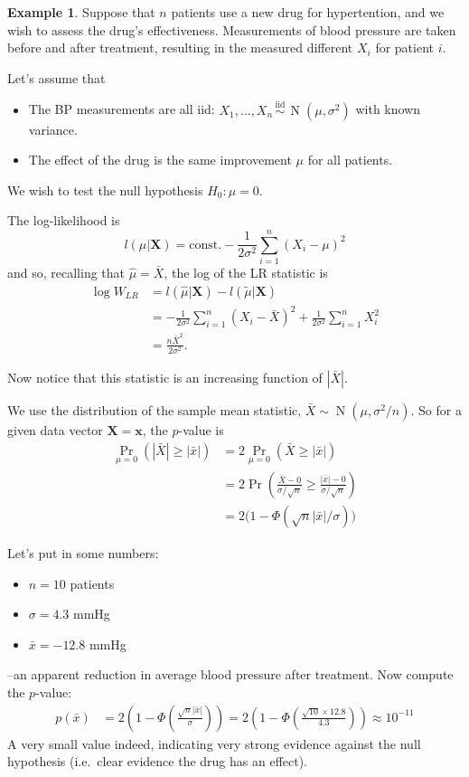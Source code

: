 \documentclass[
]{book}
\providecommand{\tightlist}{%
  \setlength{\itemsep}{0pt}\setlength{\parskip}{0pt}}
\newcommand{\bx}{{\boldsymbol x}}
\newcommand{\bX}{{\boldsymbol X}}
\DeclareMathOperator{\N}{N}
\newcommand{\iid}{\,\overset{\text{iid}}{\sim}\,}
\newcommand{\const}{\text{const.}}
\theoremstyle{definition}
\theoremstyle{definition}
\newtheorem{example}{Example}[chapter]
\theoremstyle{definition}
\theoremstyle{definition}
\theoremstyle{remark}
\begin{document}
\begin{example}
\protect\hypertarget{exm:normalknownvariance}{}\label{exm:normalknownvariance}Suppose that \(n\) patients use a new drug for hypertention, and we wish to assess the drug's effectiveness.
Measurements of blood pressure are taken before and after treatment, resulting in the measured different \(X_i\) for patient \(i\).

Let's assume that

\begin{itemize}
\tightlist
\item
  The BP measurements are all iid: \(X_1,\dots,X_n\iid\N(\mu,\sigma^2)\) with known variance.
\item
  The effect of the drug is the same improvement \(\mu\) for all patients.
\end{itemize}

We wish to test the null hypothesis \(H_0:\mu=0\).

The log-likelihood is
\[
l(\mu|\bX) = \const - \frac{1}{2\sigma^2}\sum_{i=1}^n (X_i-\mu)^2
\]
and so, recalling that \(\hat\mu=\bar X\), the log of the LR statistic is
\begin{align*}
\log W_{LR} 
&= l(\hat\mu|\bX) - l(\tilde \mu|\bX) \\
&= - \frac{1}{2\sigma^2}\sum_{i=1}^n (X_i-\bar X)^2 +  \frac{1}{2\sigma^2}\sum_{i=1}^n X_i^2 \\
&= \frac{n\bar X^2}{2\sigma^2}.
\end{align*}

Now notice that this statistic is an increasing function of \(|\bar X|\).

We use the distribution of the sample mean statistic, \(\bar X \sim \N(\mu,\sigma^2/n)\).
So for a given data vector \(\bX=\bx\), the \(p\)-value is
\begin{align*}
\Pr_{\mu=0} \left( | \bar X | \geq | \bar x | \right) 
&= 2\Pr_{\mu=0} \left( \bar X  \geq | \bar x | \right) \\ 
&=2\Pr \left( \frac{\bar X-0}{\sigma/\sqrt n}  \geq  \frac{|\bar x|-0}{\sigma/\sqrt n}  \right) \\
&= 2\big(1-\Phi(\sqrt n |\bar x|/\sigma)\big)
\end{align*}

Let's put in some numbers:

\begin{itemize}
\tightlist
\item
  \(n=10\) patients
\item
  \(\sigma=4.3\) mmHg
\item
  \(\bar x = -12.8\) mmHg
\end{itemize}

--an apparent reduction in average blood pressure after treatment. Now compute the \(p\)-value:
\begin{align*}
p(\bar x) 
&= 2\left(1-\Phi\left( \frac{\sqrt n |\bar x|}{\sigma} \right)\right) 
= 2\left(1-\Phi\left( \frac{\sqrt{10} \times 12.8}{4.3} \right)\right) 
\approx 10^{-11}
\end{align*}
A very small value indeed, indicating very strong evidence against the null hypothesis (i.e.~clear evidence the drug has an effect).
\end{example}
\end{document}

